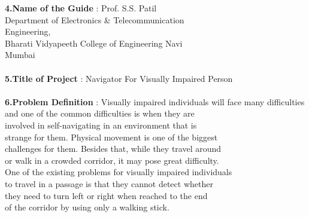 \documentclass[12pt]{article}
\begin{document}
\begin{tabbing}
		\textbf{4.Name of the Guide}\>  : Prof. S.S. Patil                   \\
		\textbf{}\> \hspace{0.18cm} Department of Electronics \& Telecommunication \\ \textbf{} \> \hspace{0.18cm}  Engineering, \\
		\textbf{}\>\hspace{0.18cm} Bharati  Vidyapeeth College of Engineering Navi  \\
		\textbf{} \>\hspace{0.18cm}  Mumbai \\
		\\
		\textbf{5.Title of Project}\>  :  Navigator For Visually Impaired Person                \\
		\\
		\textbf{6.Problem Definition}\>  : Visually impaired individuals will face many difficulties\\ \hspace{5.4cm} and one of the common difficulties is when they are\\ \hspace{5.4cm} involved  in  self-navigating in an environment that is\\ \hspace{5.4cm} strange for them.  Physical movement is one of the biggest \\ \hspace{5.4cm} challenges for them.  Besides that, while they travel around \\ \hspace{5.4cm} or walk in a crowded corridor, it may pose great difficulty. \\ \hspace{5.4cm} One of the existing  problems for visually impaired individuals \\ \hspace{5.4cm} to travel in a passage is that they cannot detect whether \\ \hspace{5.4cm} they need to turn left or right when reached to the end \\ \hspace{5.4cm} of the corridor by using only a walking stick.            \\
		

\end{tabbing}
\end{document}
